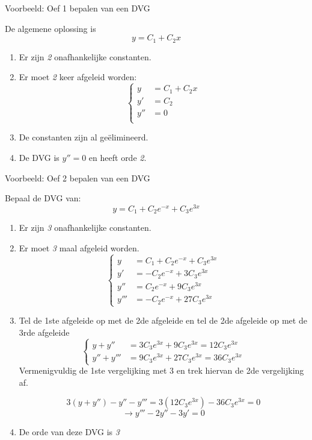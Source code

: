 \documentclass[12pt]{report}
\newcommand{\example}[2]{
    \hrulefill
    
    Voorbeeld: #1
    
    #2
    
    \hrulefill
}
\begin{document}
\example{Oef 1 bepalen van een DVG}
{
De algemene oplossing is $$y = C_1 + C_2x$$
\begin{enumerate}
\item Er zijn \textit{2} onafhankelijke constanten.
\item Er moet \textit{2} keer afgeleid worden:
$$
    \begin{cases}
    y    & = C_1 + C_2x \\
    y'   & = C_2 \\
    y''  & = 0 \\
    \end{cases}
$$
\item De constanten zijn al geëlimineerd. 
\item De DVG is $y'' = 0$ en heeft orde \textit{2}.

\end{enumerate}
}

\example{Oef 2 bepalen van een DVG}
{
Bepaal de DVG van: $$y = C_1 + C_2e^{-x} + C_3e^{3x}$$
\begin{enumerate}
\item Er zijn \textit{3} onafhankelijke constanten.
\item Er moet \textit{3} maal afgeleid worden.
    \[ 
    \begin{cases}
            y & = C_1 + C_2e^{-x} + C_3e^{3x} \\
    y'     & = -C_2e^{-x} + 3C_3e^{3x}     \\
    y'' & = C_2e^{-x} + 9C_3e^{3x}      \\
    y''' & = -C_2e^{-x} + 27C_3e^{3x}
    \end{cases}
    \]

\item 
Tel de 1ste afgeleide op met de 2de afgeleide en tel de 2de afgeleide op met de 3rde afgeleide
\[
    \begin{cases}
    y + y''    & = 3C_3e^{3x} + 9C_3e^{3x} = 12C_3e^{3x}  \\
    y'' + y''' & = 9C_3e^{3x} + 27C_3e^{3x} = 36C_3e^{3x}
    \end{cases}
\]
Vermenigvuldig de 1ste vergelijking met 3 en trek hiervan de 2de vergelijking af.

$$3(y + y'') - y'' - y''' = 3(12C_3e^{3x}) - 36C_3e^{3x} = 0$$
$$\rightarrow y''' - 2y'' - 3y' = 0$$
\item
De orde van deze DVG is \textit{3}

\end{enumerate}
}
\end{document}
